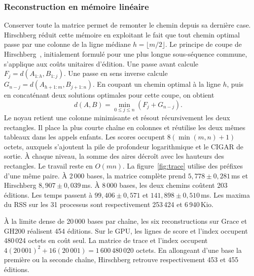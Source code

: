 \subsubsection{Reconstruction en mémoire linéaire}
Conserver toute la matrice permet de remonter le chemin depuis sa dernière case. Hirschberg réduit cette mémoire en exploitant le fait que tout chemin optimal passe par une colonne de la ligne médiane \(h=\lfloor m/2\rfloor\). Le principe de coupe de Hirschberg~\cite{hirschberg}, initialement formulé pour une plus longue sous-séquence commune, s'applique aux coûts unitaires d'édition. Une passe avant calcule \(F_j=d(A_{1:h},B_{1:j})\). Une passe en sens inverse calcule \(G_{n-j}=d(A_{h+1:m},B_{j+1:n})\). En coupant un chemin optimal à la ligne \(h\), puis en concaténant deux solutions optimales pour cette coupe, on obtient
\[
 d(A,B)=\min_{0\le j\le n}(F_j+G_{n-j}).
\]
Le noyau retient une colonne minimisante et résout récursivement les deux rectangles. Il place la plus courte chaîne en colonnes et réutilise les deux mêmes tableaux dans les appels enfants. Les scores occupent \(8(\min(m,n)+1)\) octets, auxquels s'ajoutent la pile de profondeur logarithmique et le CIGAR de sortie. À chaque niveau, la somme des aires décroît avec les hauteurs des rectangles. Le travail reste en \(O(mn)\).
La figure~\ref{fig:trace} utilise des préfixes d'une même paire. À 2\,000 bases, la matrice complète prend \(5{,}778\pm0{,}281\)\,ms et Hirschberg \(8{,}907\pm0{,}039\)\,ms. À 8\,000 bases, les deux chemins coûtent 203 éditions. Les temps passent à \(99{,}406\pm0{,}571\) et \(141{,}898\pm0{,}510\)\,ms. Les maxima du RSS sur les 31 processus sont respectivement 253\,424 et 6\,940\,Kio.

À la limite dense de 20\,000 bases par chaîne, les six reconstructions sur Grace et GH200 réalisent 454 éditions. Sur le GPU, les lignes de score et l'index occupent 480\,024 octets en coût seul. La matrice de trace et l'index occupent \(4(20\,001)^2+16(20\,001)=1\,600\,480\,020\) octets. En allongeant d'une base la première ou la seconde chaîne, Hirschberg retrouve respectivement 453 et 455 éditions.

